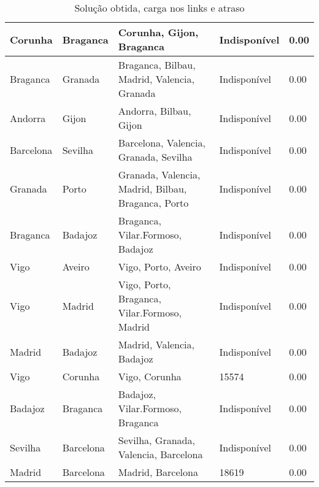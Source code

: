 \begin{table}[!htb]
{\begin{tabular}{|l|l|l|l|l|}
Corunha & Braganca & Corunha, Gijon, Braganca & Indisponível & 0.00 \\ \hline
Braganca & Granada & Braganca, Bilbau, Madrid, Valencia, Granada & Indisponível & 0.00 \\ \hline
Andorra & Gijon & Andorra, Bilbau, Gijon & Indisponível & 0.00 \\ \hline
Barcelona & Sevilha & Barcelona, Valencia, Granada, Sevilha & Indisponível & 0.00 \\ \hline
Granada & Porto & Granada, Valencia, Madrid, Bilbau, Braganca, Porto & Indisponível & 0.00 \\ \hline
Braganca & Badajoz & Braganca, Vilar.Formoso, Badajoz & Indisponível & 0.00 \\ \hline
Vigo & Aveiro & Vigo, Porto, Aveiro & Indisponível & 0.00 \\ \hline
Vigo & Madrid & Vigo, Porto, Braganca, Vilar.Formoso, Madrid & Indisponível & 0.00 \\ \hline
Madrid & Badajoz & Madrid, Valencia, Badajoz & Indisponível & 0.00 \\ \hline
Vigo & Corunha & Vigo, Corunha & 15574 & 0.00 \\ \hline
Badajoz & Braganca & Badajoz, Vilar.Formoso, Braganca & Indisponível & 0.00 \\ \hline
Sevilha & Barcelona & Sevilha, Granada, Valencia, Barcelona & Indisponível & 0.00 \\ \hline
Madrid & Barcelona & Madrid, Barcelona & 18619 & 0.00 \\ \hline
\end{tabular}}
\caption[]{Solução obtida, carga nos links e atraso}
\end{table}

